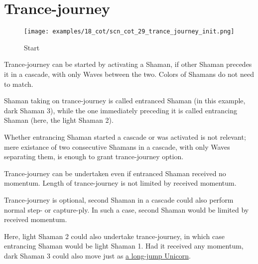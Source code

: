 \clearpage %

\section*{Trance-journey}
\label{sec:Conquest of Tlalocan/Trance-journey}

\noindent
\begin{wrapfigure}[13]{l}{0.4\textwidth}
\centering
\texttt{[image: examples/18\_cot/scn\_cot\_29\_trance\_journey\_init.png]}
\caption{Start}
\label{fig:scn_cot_29_trance_journey_init}
\end{wrapfigure}
Trance-journey can be started by activating a Shaman, if other Shaman precedes
it in a cascade, with only Waves between the two. Colors of Shamans do not need
to match.

Shaman taking on trance-journey is called entranced Shaman (in this example,
dark Shaman 3), while the one immediately preceding it is called entrancing
Shaman (here, the light Shaman 2).

Whether entrancing Shaman started a cascade or was activated is not relevant;
mere existance of two consecutive Shamans in a cascade, with only Waves separating
them, is enough to grant trance-journey option.

Trance-journey can be undertaken even if entranced Shaman received no momentum.
Length of trance-journey is not limited by received momentum.

Trance-journey is optional, second Shaman in a cascade could also perform normal
step- or capture-ply. In such a case, second Shaman would be limited by received
momentum.

Here, light Shaman 2 could also undertake trance-journey, in which case entrancing
Shaman would be light Shaman 1.
Had it received any momentum, dark Shaman 3 could also move just as
\hyperref[fig:scn_cot_04_dark_shaman_step_ply]{a long-jump Unicorn}.

\clearpage %

